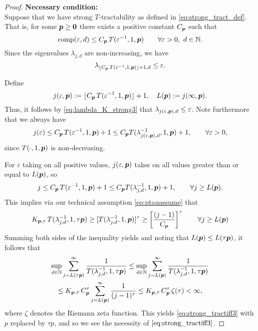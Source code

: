 \documentclass[11pt,a4paper]{article}
\begin{document}
\begin{proof}
\bigskip
\noindent \textbf{Necessary condition:} \\
Suppose that we have strong
$T$-tractability as defined in \eqref{eq:strong_tract_def}. That is, for some $\boldsymbol{p} \ge \boldsymbol{0}$ there exists a positive constant $C_{\boldsymbol{p}}$ such that
\[
\operatorname{comp}(\varepsilon,d)\le C_{\boldsymbol{p}}\, T(\varepsilon^{-1},1,\boldsymbol{p})
\qquad \forall \varepsilon > 0, \ d \in \mathbb{N}.
\]
Since the eigenvalues $\lambda_{j,d}$ are non-increasing, we have
\begin{equation}\label{eq:lambda_K_strong3}
\lambda_{\lfloor C_{\boldsymbol{p}}\, T(\varepsilon^{-1},1,\boldsymbol{p})\rfloor +1,d}\le \varepsilon.
\end{equation}

Define
\[
j (\varepsilon,\boldsymbol{p}):= \lfloor C_{\boldsymbol{p}}\, T(\varepsilon^{-1},1,\boldsymbol{p})\rfloor +1, \quad
 L(\boldsymbol{p}):= j (\infty,\boldsymbol{p}).
\]
Thus, it follows by \eqref{eq:lambda_K_strong3} that $\lambda_{j(\varepsilon,\boldsymbol{p}),d} \le \varepsilon$.
Note furthermore that we always have
\[
j(\varepsilon)\le C_{\boldsymbol{p}}\, T(\varepsilon^{-1},1,\boldsymbol{p})+1 \le C_{\boldsymbol{p}} T(\lambda_{j(\varepsilon,\boldsymbol{p}),d}^{-1},1,\boldsymbol{p})+1, \qquad \forall \varepsilon > 0,
\]
since
$T(\cdot,1, \boldsymbol{p})$ is non-decreasing.

For $\varepsilon$ taking on all positive values, $j(\varepsilon,\boldsymbol{p})$ takes on all values greater than or equal to $L(\boldsymbol{p})$, so
\[
j\le C_{\boldsymbol{p}}\, T(\varepsilon^{-1},1,\boldsymbol{p})+1 \le C_{\boldsymbol{p}} T(\lambda_{j,d}^{-1},1,\boldsymbol{p})+1, \qquad \forall j \ge L(\boldsymbol{p}).
\]
This implies via our technical assumption \eqref{eq:ptauassume} that
\begin{equation*}
 K_{\boldsymbol{p},\tau}\,T (\lambda_{j,d}^{-1},1,\tau \boldsymbol{p}) \ge
 [T(\lambda_{j,d}^{-1},1, \boldsymbol{p})]^\tau
 \ge
  \left[\frac{(j-1)}{C_{\boldsymbol{p}}}\right]^\tau \qquad \forall j \ge L(\boldsymbol{p})
\end{equation*}
Summing both sides of the inequality yields and noting that $L(\boldsymbol{p}) \le L(\tau\boldsymbol{p})$, it follows that
\begin{multline*}
\sup_{d\in\mathbb{N}} \sum_{j=L(\tau\boldsymbol{p})}^\infty \frac{1}{T (\lambda_{j,d}^{-1},1, \tau \boldsymbol{p})} \le
\sup_{d\in\mathbb{N}} \sum_{j=L(\boldsymbol{p})}^\infty \frac{1}{T (\lambda_{j,d}^{-1},1, \tau \boldsymbol{p})} \\
\le K_{\boldsymbol{p},\tau}\, C_{\boldsymbol{p}}^\tau
\sum_{j=L(\boldsymbol{p})}^\infty \frac{1}{(j-1)^\tau} \le
K_{\boldsymbol{p},\tau}\, C_{\boldsymbol{p}}^\tau\, \zeta (\tau) < \infty,
\end{multline*}
where $\zeta$ denotes the Riemann zeta function.
This yields \eqref{eq:strong_tractiff3} with $p$ replaced by $\tau p$, and so we see the necessity of $\eqref{eq:strong_tractiff3}$.


\end{proof}
\end{document}
